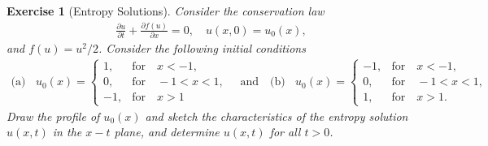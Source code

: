 \documentclass[10pt,letterpaper]{article}
\theoremstyle{break}
\newtheorem{exercise}{Exercise}
\begin{document}
\begin{exercise}[Entropy Solutions]
    Consider the conservation law 
    \begin{align}
    	\frac{\partial u}{\partial t}
    	+
    	\frac{\partial f(u)}{\partial x}
    	= 0,
    	\quad
    	u(x,0)=u_0(x),
    \end{align}
    and $f(u) = u^2/2$.
    Consider the following initial conditions
    \begin{align}
    	\text{(a)}
    	\,\,\;\;
    	u_0(x) = 
    	\left\{
    	\begin{array}{cl}
    	1, & \text{for} \quad x<-1,\\
    	0, &\text{for} \quad -1<x< 1,\\
    	-1, &\text{for} \quad x > 1
    	\end{array}
    	\right.
    	\quad
    	\text{and}
    	\quad
    	\text{(b)}
    	\,\,\;\;
    	u_0(x) = 
    	\left\{
    	\begin{array}{cl}
    	-1, & \text{for} \quad x<-1,\\
    	0, &\text{for} \quad -1<x < 1, \\
    	1, &\text{for} \quad x > 1.
    	\end{array}
    	\right.
    \end{align}
    Draw the profile of $u_0(x)$ and sketch the characteristics
    of the entropy solution $u(x,t)$ in the $x-t$ plane, and
    determine $u(x,t)$ for all $t > 0$.
\end{exercise}
\end{document}
